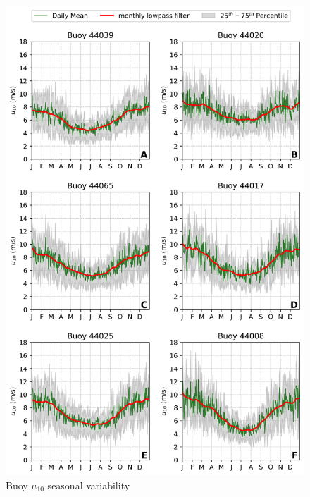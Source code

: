 \begin{figure}[H]
\centering
\includegraphics[width=0.95\linewidth]{Figures/Chapter5/buoys_wind_seasonal_qt1.png}
\caption{Buoy $u_{10}$ seasonal variability}
\label{fig:buoy_wind_seasonality}
\end{figure}


